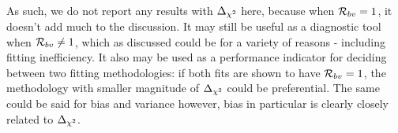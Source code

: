 As such, we do not report any results with $\Delta_{\chi^2}$ here, because
when $\mathcal{R}_{bv} = 1$, it doesn't add much to the discussion. It may still
be useful as a diagnostic tool when $\mathcal{R}_{bv} \neq 1$, which as discussed
could be for a variety of reasons - including fitting inefficiency. It also
may be used as a performance indicator for deciding between two fitting
methodologies: if both fits are shown to have $\mathcal{R}_{bv} = 1$, the
methodology with smaller magnitude of $\Delta_{\chi^2}$ could be preferential.
The same could be said for bias and variance however, bias in particular is
clearly closely related to $\Delta_{\chi^2}$.
